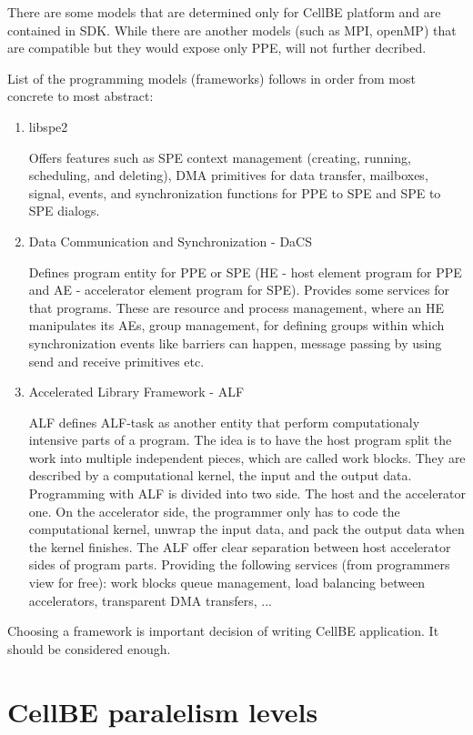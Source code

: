 There are some models that are determined only for CellBE platform and are contained in SDK. While there are another models (such as MPI, openMP) that are compatible but they would expose only PPE, will not further decribed.

List of the programming models (frameworks) follows in order from most concrete to most abstract:
\begin{enumerate}
\item {libspe2}
\par
Offers features such as SPE context management (creating, running, scheduling, and deleting), DMA primitives for data transfer, mailboxes, signal, events, and synchronization functions for PPE to SPE and SPE to SPE dialogs. 

\item {Data Communication and Synchronization - DaCS}
\par
Defines program entity for PPE or SPE (HE - host element program for PPE and AE - accelerator element program for SPE). Provides some services for that programs. These are resource and process management, where an HE manipulates its AEs, group management, for defining groups within which synchronization events like barriers can happen, message passing by using send and receive primitives etc.

\item {Accelerated Library Framework - ALF}
\par
ALF defines ALF-task as another entity that perform computationaly intensive parts of a program. The idea is to have the host program split the work into multiple independent pieces, which are called work blocks. They are described by a computational kernel, the input and the output data. Programming with ALF is divided into two side. The host and the accelerator one. On the accelerator side, the programmer only has to code the computational kernel, unwrap the input data, and pack the output data when the kernel finishes. The ALF offer clear separation between host accelerator sides of program parts. Providing the following services (from programmers view for free): work blocks queue management, load balancing between accelerators, transparent DMA transfers, ...

\end{enumerate}

Choosing a framework is important decision of writing CellBE application. It should be considered enough.

\section {CellBE paralelism levels}

